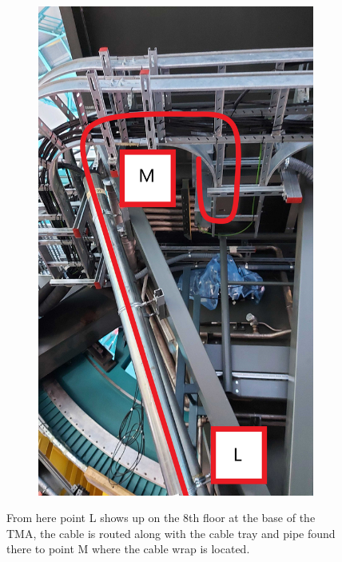 \begin{figure}
\begin{subfigure}{0.40\textwidth}
      \includegraphics[width=\textwidth]{images/27-1.jpg}
    \end{subfigure}
    \caption*{From here point L shows up on the 8th floor at the base of the TMA, the cable is routed along with the cable tray and pipe found there to point M where the cable wrap is located.}
  \end{figure}

\newpage

